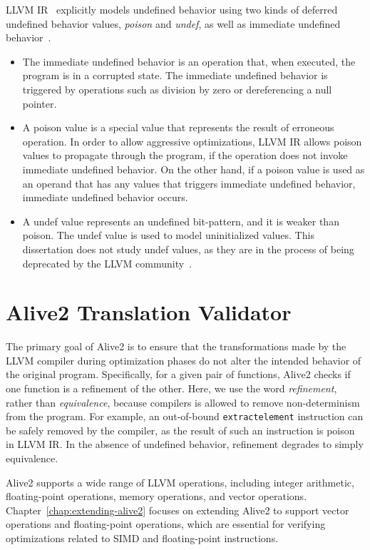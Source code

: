 LLVM IR~\cite{LLVM:CGO04} explicitly models undefined behavior using
two kinds of deferred undefined behavior values, \emph{poison} and
\emph{undef}, as well as immediate undefined behavior~\cite{taming}.

\begin{itemize}
%
\item The immediate undefined behavior is an operation that, when
executed, the program is in a corrupted state.
%
The immediate undefined behavior is triggered by operations such as
division by zero or dereferencing a null pointer.

\item A poison value is a special value that represents the result of
erroneous operation.
%
In order to allow aggressive optimizations, LLVM IR allows poison
values to propagate through the program, if the operation does not
invoke immediate undefined behavior.
%
On the other hand, if a poison value is used as an operand that has
any values that triggers immediate undefined behavior, immediate
undefined behavior occurs.

\item A undef value represents an undefined bit-pattern, and it is
weaker than poison. The undef value is used to model uninitialized
values.
%
This dissertation does not study undef values, as they are in the
process of being deprecated by the LLVM community~\cite{killundef}.
\end{itemize}

\section {Alive2 Translation Validator}

The primary goal of Alive2 is to ensure that the transformations made
by the LLVM compiler during optimization phases do not alter the
intended behavior of the original program.
%
Specifically, for a given pair of functions,
Alive2 checks if one function is a refinement of the other.
%
Here, we use the word \emph{refinement}, rather than \emph{equivalence},
because compilers is allowed to remove non-determinism from the
program.
%
For example, an out-of-bound \texttt{extractelement} instruction can
be safely removed by the compiler, as the result of such an
instruction is poison in LLVM IR.
%
In the absence of undefined behavior, refinement degrades to
simply equivalence.

Alive2 supports a wide range of LLVM operations, including integer
arithmetic, floating-point operations, memory operations, and vector
operations.
%
Chapter~\ref{chap:extending-alive2} focuses on extending Alive2 to
support vector operations and floating-point operations, which are
essential for verifying optimizations related to SIMD and
floating-point instructions.


